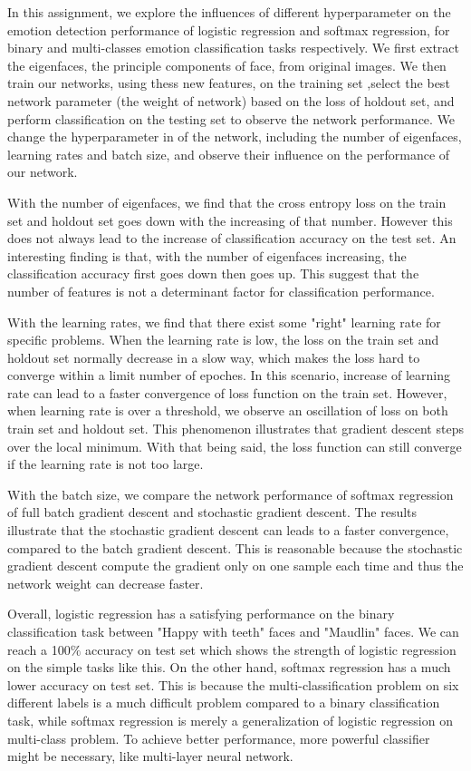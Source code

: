 \documentclass{article} %
\begin{document}
In this assignment, we explore the influences of different hyperparameter on the emotion detection performance of logistic regression and softmax regression, for binary and multi-classes emotion classification tasks respectively. We first extract the eigenfaces, the principle components of face, from original images. We then train our networks, using thess new features, on the training set ,select the best network parameter (the weight of network) based on the loss of holdout set, and perform classification on the testing set to observe the network performance. We change the hyperparameter in of the network, including the number of eigenfaces, learning rates and batch size, and observe their influence on the performance of our network. 

With the number of eigenfaces, we find that the cross entropy loss on the train set and holdout set goes down with the increasing of that number. However this does not always lead to the increase of classification accuracy on the test set. An interesting finding is that, with the number of eigenfaces increasing, the classification accuracy first goes down then goes up. This suggest that the number of features is not a determinant factor for classification performance. 

With the learning rates, we find that there exist some "right" learning rate for specific problems. When the learning rate is low, the loss on the train set and holdout set normally decrease in a slow way, which makes the loss hard to converge within a limit number of epoches. In this scenario, increase of learning rate can lead to a faster convergence of loss function on the train set. However, when learning rate is over a threshold, we observe an oscillation of loss on both train set and holdout set. This phenomenon illustrates that gradient descent steps over the local minimum. With that being said, the loss function can still converge if the learning rate is not too large.

With the batch size, we compare the network performance of softmax regression of full batch gradient descent and stochastic gradient descent. The results illustrate that the stochastic gradient descent can leads to a faster convergence, compared to the batch gradient descent. This is reasonable because the stochastic gradient descent compute the gradient only on one sample each time and thus the network weight can decrease faster.

Overall, logistic regression has a satisfying performance on the binary classification task between "Happy with teeth" faces and "Maudlin" faces. We can reach a 100$\%$ accuracy on test set which shows the strength of logistic regression on the simple tasks like this. On the other hand, softmax regression has a much lower accuracy on test set. This is because the multi-classification problem on six different labels is a much difficult problem compared to a binary classification task, while softmax regression is merely a generalization of logistic regression on multi-class problem. To achieve better performance, more powerful classifier might be necessary, like multi-layer neural network.
\end{document}
